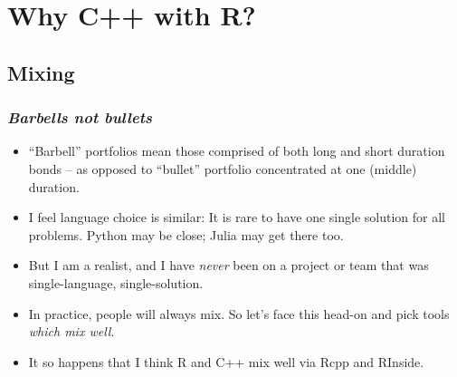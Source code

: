\documentclass[dvipsnames,compress,pdflatex,beamer]{beamer}
\begin{document}
\section[With R]{Why C++ with R?}
\subsection{Mixing}
\begin{frame}
  \frametitle{\textsl{Barbells not bullets}}
  \begin{itemize}[<+->]
  \item ``Barbell'' portfolios mean those comprised of both long and short
    duration bonds -- as opposed to ``bullet'' portfolio concentrated at one
    (middle) duration. 
  \item I feel language choice is similar:  It is rare to have one single
    solution for all problems. Python may be close;  Julia may get there too.
  \item But I am a realist, and I have \emph{never} been on a project or
    team that was single-language, single-solution.
  \item In practice, people will always mix.  %
    So let's face this head-on and pick tools \emph{which mix well}.  
  \item It so happens that I think R and C++ mix well via Rcpp and RInside.
  \end{itemize}
\end{frame}
\end{document}
